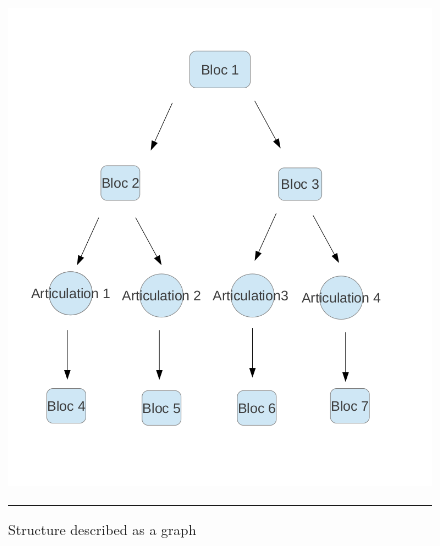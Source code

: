 \begin{figure}[htbp]
    \centering
    \includegraphics[scale=0.5]{Figures/schema_arbre.png}
    \rule{35em}{0.5pt}
    \caption[Structure described as graph]{Structure described as a graph}
    \label{fig:TreeStruct}
\end{figure}


